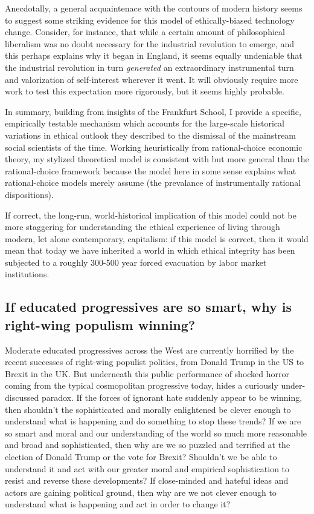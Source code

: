 \documentclass[a4paper,12pt,margin=.5in]{article}
\begin{document}
Anecdotally, a general acquaintenace with the contours of modern history
seems to suggest some striking evidence for this model of
ethically-biased technology change. Consider, for instance, that while a
certain amount of philosophical liberalism was no doubt necessary for
the industrial revolution to emerge, and this perhaps explains why it
began in England, it seems equally undeniable that the industrial
revolution in turn \emph{generated} an extraordinary instrumental turn
and valorization of self-interest wherever it went. It will obviously
require more work to test this expectation more rigorously, but it seems
highly probable.

In summary, building from insights of the Frankfurt School, I provide a
specific, empirically testable mechanism which accounts for the
large-scale historical variations in ethical outlook they described to
the dismissal of the mainstream social scientists of the time. Working
heuristically from rational-choice economic theory, my stylized
theoretical model is consistent with but more general than the
rational-choice framework because the model here in some sense explains
what rational-choice models merely assume (the prevalance of
instrumentally rational dispositions).

If correct, the long-run, world-historical implication of this model
could not be more staggering for understanding the ethical experience of
living through modern, let alone contemporary, capitalism: if this model
is correct, then it would mean that today we have inherited a world in
which ethical integrity has been subjected to a roughly 300-500 year
forced evacuation by labor market institutions.

\subsection{If educated progressives are so smart, why is right-wing
populism
winning?}\label{if-educated-progressives-are-so-smart-why-is-right-wing-populism-winning}

Moderate educated progressives across the West are currently horrified
by the recent successes of right-wing populist politics, from Donald
Trump in the US to Brexit in the UK. But underneath this public
performance of shocked horror coming from the typical cosmopolitan
progressive today, hides a curiously under-discussed paradox. If the
forces of ignorant hate suddenly appear to be winning, then shouldn't
the sophisticated and morally enlightened be clever enough to understand
what is happening and do something to stop these trends? If we are so
smart and moral and our understanding of the world so much more
reasonable and broad and sophisticated, then why are we so puzzled and
terrified at the election of Donald Trump or the vote for Brexit?
Shouldn't we be able to understand it and act with our greater moral and
empirical sophistication to resist and reverse these developments? If
close-minded and hateful ideas and actors are gaining political ground,
then why are we not clever enough to understand what is happening and
act in order to change it?
\end{document}
